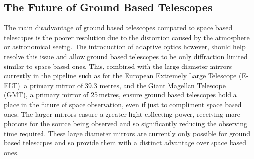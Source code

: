 	\subsection{The Future of Ground Based Telescopes} %
	\label{sub:the_future_of_ground_based_telescopes}
		The main disadvantage of ground based telescopes compared to space based telescopes is the poorer resolution due to the distortion caused by the atmosphere or astronomical seeing. The introduction of adaptive optics however, should help resolve this issue and allow ground based telescopes to be only diffraction limited similar to space based ones. This, combined with the large diameter mirrors currently in the pipeline such as for the European Extremely Large Telescope (E-ELT), a primary mirror of 39.3 metres, and the Giant Magellan Telescope (GMT), a primary mirror of 25\,metres, ensure ground based telescopes hold a place in the future of space observation, even if just to compliment space based ones. The larger mirrors ensure a greater light collecting power, receiving more photons for the source being observed and so significantly reducing the observing time required. These large diameter mirrors are currently only possible for ground based telescopes and so provide them with a distinct advantage over space based ones.

